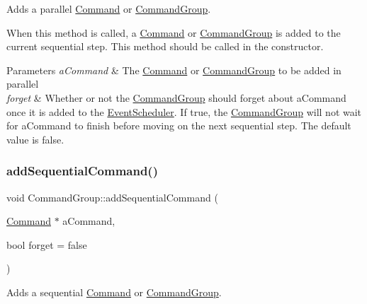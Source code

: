 Adds a parallel \mbox{\hyperlink{classlib_iterative_robot_1_1_command}{Command}} or \mbox{\hyperlink{classlib_iterative_robot_1_1_command_group}{Command\+Group}}. 

When this method is called, a \mbox{\hyperlink{classlib_iterative_robot_1_1_command}{Command}} or \mbox{\hyperlink{classlib_iterative_robot_1_1_command_group}{Command\+Group}} is added to the current sequential step. This method should be called in the constructor.


\begin{DoxyParams}{Parameters}
{\em a\+Command} & The \mbox{\hyperlink{classlib_iterative_robot_1_1_command}{Command}} or \mbox{\hyperlink{classlib_iterative_robot_1_1_command_group}{Command\+Group}} to be added in parallel \\
\hline
{\em forget} & Whether or not the \mbox{\hyperlink{classlib_iterative_robot_1_1_command_group}{Command\+Group}} should forget about a\+Command once it is added to the \mbox{\hyperlink{classlib_iterative_robot_1_1_event_scheduler}{Event\+Scheduler}}. If true, the \mbox{\hyperlink{classlib_iterative_robot_1_1_command_group}{Command\+Group}} will not wait for a\+Command to finish before moving on the next sequential step. The default value is false. \\
\hline
\end{DoxyParams}
\mbox{\label{classlib_iterative_robot_1_1_command_group_a7e3167a89a45e6b1fc5df9a18c2946b7}} 
\subsubsection{\texorpdfstring{addSequentialCommand()}{addSequentialCommand()}}
{\footnotesize\ttfamily void Command\+Group\+::add\+Sequential\+Command (\begin{DoxyParamCaption}\item[{\mbox{\hyperlink{classlib_iterative_robot_1_1_command}{Command}} $\ast$}]{a\+Command,  }\item[{bool}]{forget = {\ttfamily false} }\end{DoxyParamCaption})}



Adds a sequential \mbox{\hyperlink{classlib_iterative_robot_1_1_command}{Command}} or \mbox{\hyperlink{classlib_iterative_robot_1_1_command_group}{Command\+Group}}. 

